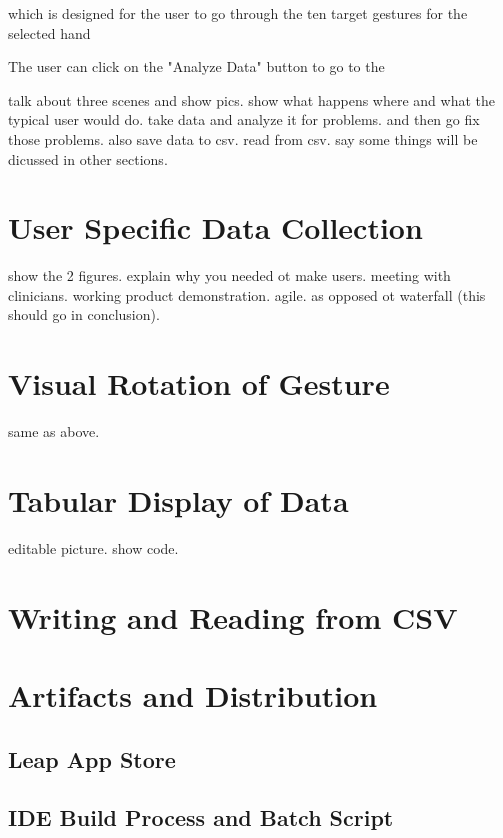  which is designed for the user to go through the ten target gestures for the selected hand




 The user can click on the "Analyze Data" button to go to the 


talk about three scenes and show pics. show what happens where and 
what the typical user would do. 
take data and analyze it for problems. 
and then go fix those problems. 
also save data to csv. read from csv. 
say some things will be dicussed in other sections. 


\section{User Specific Data Collection}


show the 2 figures. explain why you needed ot make users. meeting with clinicians. working product demonstration. agile. as opposed ot waterfall (this should go in conclusion). 

 

\section{Visual Rotation of Gesture}

same as above. 

\section{Tabular Display of Data}

editable picture. show code. 
\section{Writing and Reading from CSV}


\section{Artifacts and Distribution}

\subsection{Leap App Store}

\subsection{IDE Build Process and Batch Script}


